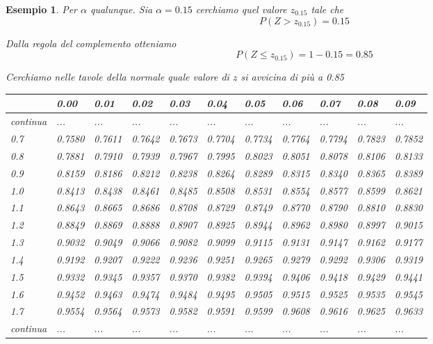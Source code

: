 \documentclass[
  11pt,
]{book}
\theoremstyle{mytheoremstyle}
\theoremstyle{mydefstyle}
\newtheorem{example}{{Esempio}}[section]
\begin{document}
\begin{example}

Per \(\alpha\) qualunque.
Sia \(\alpha=0.15\) cerchiamo quel valore \(z_{0.15}\) tale che
\[P(Z>z_{0.15})=0.15\]

Dalla regola del complemento otteniamo
\[P(Z\leq z_{0.15})=1-0.15=0.85\]

Cerchiamo nelle tavole della normale quale valore di \(z\) si avvicina di più a 0.85

\begin{tabular}{lllll|>{}l|lllll}
\toprule
  & 0.00 & 0.01 & 0.02 & 0.03 & 0.04 & 0.05 & 0.06 & 0.07 & 0.08 & 0.09\\
\midrule
continua & ... & ... & ... & ... & \textcolor[HTML]{AB292E}{...} & ... & ... & ... & ... & \vphantom{1} ...\\
0.7 & 0.7580 & 0.7611 & 0.7642 & 0.7673 & \textcolor[HTML]{AB292E}{0.7704} & 0.7734 & 0.7764 & 0.7794 & 0.7823 & 0.7852\\
0.8 & 0.7881 & 0.7910 & 0.7939 & 0.7967 & \textcolor[HTML]{AB292E}{0.7995} & 0.8023 & 0.8051 & 0.8078 & 0.8106 & 0.8133\\
0.9 & 0.8159 & 0.8186 & 0.8212 & 0.8238 & \textcolor[HTML]{AB292E}{0.8264} & 0.8289 & 0.8315 & 0.8340 & 0.8365 & 0.8389\\
\midrule
\textcolor[HTML]{AB292E}{1.0} & \textcolor[HTML]{AB292E}{0.8413} & \textcolor[HTML]{AB292E}{0.8438} & \textcolor[HTML]{AB292E}{0.8461} & \textcolor[HTML]{AB292E}{0.8485} & \textcolor[HTML]{AB292E}{0.8508} & \textcolor[HTML]{AB292E}{0.8531} & \textcolor[HTML]{AB292E}{0.8554} & \textcolor[HTML]{AB292E}{0.8577} & \textcolor[HTML]{AB292E}{0.8599} & \textcolor[HTML]{AB292E}{0.8621}\\
\midrule
1.1 & 0.8643 & 0.8665 & 0.8686 & 0.8708 & \textcolor[HTML]{AB292E}{0.8729} & 0.8749 & 0.8770 & 0.8790 & 0.8810 & 0.8830\\
1.2 & 0.8849 & 0.8869 & 0.8888 & 0.8907 & \textcolor[HTML]{AB292E}{0.8925} & 0.8944 & 0.8962 & 0.8980 & 0.8997 & 0.9015\\
1.3 & 0.9032 & 0.9049 & 0.9066 & 0.9082 & \textcolor[HTML]{AB292E}{0.9099} & 0.9115 & 0.9131 & 0.9147 & 0.9162 & 0.9177\\
1.4 & 0.9192 & 0.9207 & 0.9222 & 0.9236 & \textcolor[HTML]{AB292E}{0.9251} & 0.9265 & 0.9279 & 0.9292 & 0.9306 & 0.9319\\
1.5 & 0.9332 & 0.9345 & 0.9357 & 0.9370 & \textcolor[HTML]{AB292E}{0.9382} & 0.9394 & 0.9406 & 0.9418 & 0.9429 & 0.9441\\
1.6 & 0.9452 & 0.9463 & 0.9474 & 0.9484 & \textcolor[HTML]{AB292E}{0.9495} & 0.9505 & 0.9515 & 0.9525 & 0.9535 & 0.9545\\
1.7 & 0.9554 & 0.9564 & 0.9573 & 0.9582 & \textcolor[HTML]{AB292E}{0.9591} & 0.9599 & 0.9608 & 0.9616 & 0.9625 & 0.9633\\
continua & ... & ... & ... & ... & \textcolor[HTML]{AB292E}{...} & ... & ... & ... & ... & ...\\
\bottomrule
\end{tabular}


\end{example}
\end{document}
